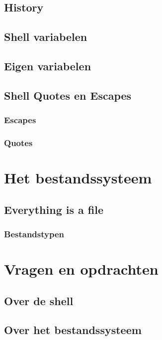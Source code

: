 \documentclass[a4paper,12pt,twoside,openright,titlepage]{book}
\begin{document}
\section{History}

\section{Shell variabelen}

\section{Eigen variabelen}

\section{Shell Quotes en Escapes}

\subsection{Escapes}

\subsection{Quotes}

\chapter{Het bestandssysteem}

\section{Everything is a file}

\subsection{Bestandstypen}

\chapter{Vragen en opdrachten}
\section{Over de shell}

\section{Over het bestandssysteem}



\backmatter
\printindex
\end{document}
